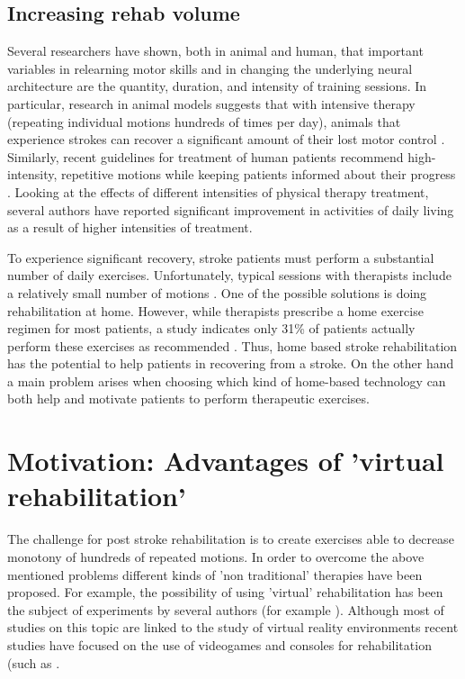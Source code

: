 \documentclass[preprint,authoryear,12pt]{elsarticle}
\begin{document}
\subsection{Increasing rehab volume}
\label{motivation}

Several researchers have shown, both in animal and human, that important variables in relearning motor skills and in changing the underlying neural architecture are the quantity, duration, and intensity of training sessions.
In particular, research in animal models suggests that with intensive therapy (repeating individual motions hundreds of times per day), animals that experience strokes can recover a significant amount of their lost motor control \citep{Selzer}.  Similarly, recent guidelines for treatment of human patients recommend high-intensity, repetitive motions while keeping patients informed about their progress \citep{Langhorne}. Looking at the effects of different intensities of physical therapy treatment, several authors \citep{Langhorne96, Taub99,Taub00} have reported significant improvement in activities of daily living as a result of higher intensities of treatment. 

To experience significant recovery, stroke patients must perform a substantial number of daily exercises. Unfortunately, typical sessions with therapists include a relatively small number of motions \citep{Lang}. One of the possible solutions is doing rehabilitation at home. However, while therapists prescribe a home exercise regimen for most patients, a study indicates only 31\% of patients actually perform these exercises as recommended \citep{Shaughnessy}. Thus, home based stroke rehabilitation has the potential to help patients in recovering from a stroke. On the other hand a  main problem arises when choosing  which kind of home-based technology can both help and motivate patients to perform therapeutic exercises.


\section{Motivation: Advantages of 'virtual rehabilitation'}
\label{advantages}
The challenge for post stroke rehabilitation is to create exercises able to decrease monotony of hundreds of repeated motions. In order to overcome the above mentioned problems different kinds of 'non traditional' therapies have been proposed. 
For example, the possibility of using 'virtual' rehabilitation has been the subject of experiments by several authors (for example \citep{Rizzo2005,burdea}). Although most of studies on this topic are linked to the study of virtual reality environments recent studies have focused on the use of videogames and consoles for rehabilitation (such as \citep{Burke2009c,Flynn}. 
\end{document}
